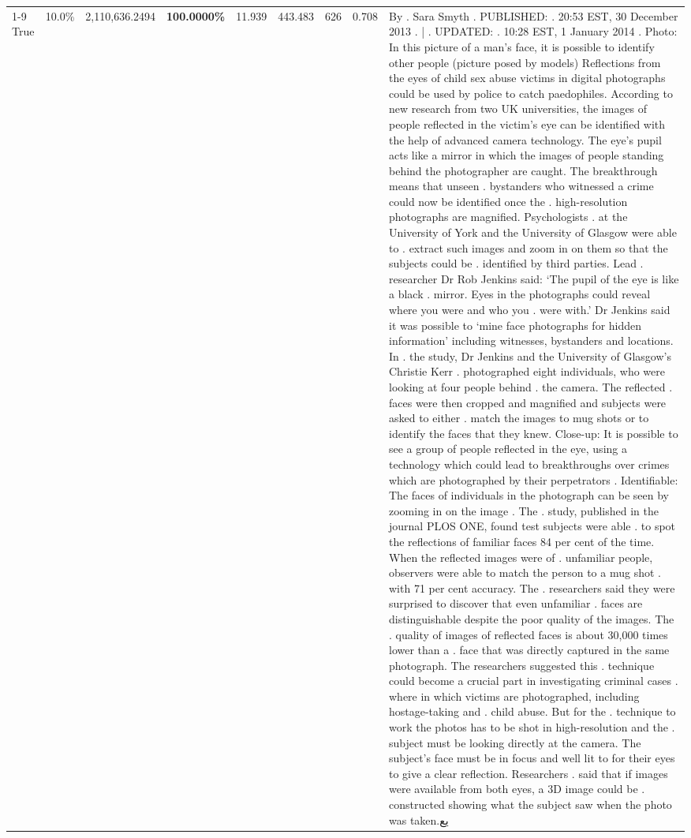 \begin{table}[H]
\begin{tabular}{lllrlllll}
\cline{1-9}
True & 10.0\% & 2,110,636.2494 & \bfseries \color{red} 100.0000\% & 11.939 & 443.483 & 626 & 0.708 & By . Sara Smyth . PUBLISHED: . 20:53 EST, 30 December 2013 . | . UPDATED: . 10:28 EST, 1 January 2014 . Photo: In this picture of a man's face, it is possible to identify other people (picture posed by models) Reflections from the eyes of child sex abuse victims in digital photographs could be used by police to catch paedophiles. According to new research from two UK universities, the images of people reflected in the victim's eye can be identified with the help of advanced camera technology. The eye's pupil acts like a mirror in which the images of people standing behind the photographer are caught. The breakthrough means that unseen . bystanders who witnessed a crime could now be identified once the . high-resolution photographs are magnified. Psychologists . at the University of York and the University of Glasgow were able to . extract such images and zoom in on them so that the subjects could be . identified by third parties. Lead . researcher Dr Rob Jenkins said: ‘The pupil of the eye is like a black . mirror. Eyes in the photographs could reveal where you were and who you . were with.' Dr Jenkins said it was possible to ‘mine face photographs for hidden information' including witnesses, bystanders and locations. In . the study, Dr Jenkins and the University of Glasgow's Christie Kerr . photographed eight individuals, who were looking at four people behind . the camera. The reflected . faces were then cropped and magnified and subjects were asked to either . match the images to mug shots or to identify the faces that they knew. Close-up: It is possible to see a group of people reflected in the eye, using a technology which could lead to breakthroughs over crimes which are photographed by their perpetrators . Identifiable: The faces of individuals in the photograph can be seen by zooming in on the image . The . study, published in the journal PLOS ONE, found test subjects were able . to spot the reflections of familiar faces 84 per cent of the time. When the reflected images were of . unfamiliar people, observers were able to match the person to a mug shot . with 71 per cent accuracy. The . researchers said they were surprised to discover that even unfamiliar . faces are distinguishable despite the poor quality of the images. The . quality of images of reflected faces is about 30,000 times lower than a . face that was directly captured in the same photograph. The researchers suggested this . technique could become a crucial part in investigating criminal cases . where in which victims are photographed, including hostage-taking and . child abuse. But for the . technique to work the photos has to be shot in high-resolution and the . subject must be looking directly at the camera. The subject's face must be in focus and well lit to for their eyes to give a clear reflection. Researchers . said that if images were available from both eyes, a 3D image could be . constructed showing what the subject saw when the photo was taken.يع \\

\end{tabular}
\end{table}
